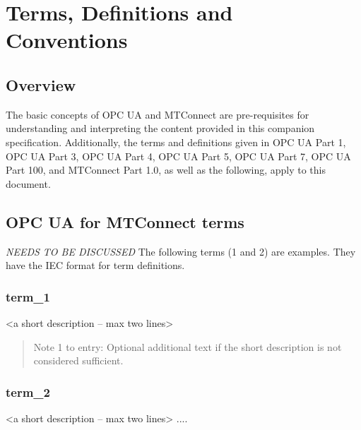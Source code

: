 \section{Terms, Definitions and Conventions}\label{termsdefinitionsconventions}

\subsection{Overview}

The basic concepts of OPC UA and MTConnect are pre-requisites for understanding and interpreting the content provided in this companion specification. Additionally, the terms and definitions given in OPC UA Part 1, OPC UA Part 3, OPC UA Part 4, OPC UA Part 5, OPC UA Part 7, OPC UA Part 100, and MTConnect Part 1.0, as well as the following, apply to this document. 


\subsection{OPC UA for MTConnect terms}

\textit{NEEDS TO BE DISCUSSED}
The following terms (1 and 2) are examples. They have the IEC format for term definitions.

\subsubsection{term\_1}
<a short description – max two lines>

\begin{quote}
\footnotesize
Note 1 to entry: Optional additional text if the short description is not considered sufficient.
\end{quote}

\subsubsection{term\_2}
<a short description – max two lines>
....

